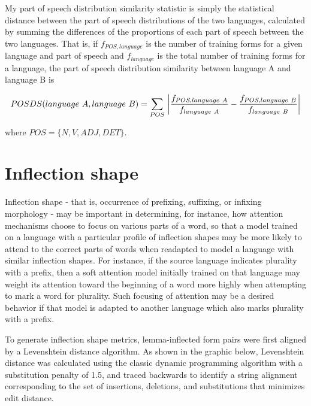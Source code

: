 My part of speech distribution similarity statistic is simply the statistical distance between the part of speech distributions of the two languages, calculated by summing the differences of the proportions of each part of speech between the two languages. That is, if $f_{POS, language}$ is the number of training forms for a given language and part of speech and $f_{language}$ is the total number of training forms for a language, the part of speech distribution similarity between language A and language B is

\[POSDS(language\ A, language\ B) = \sum\limits_{POS}\ \abs*{\frac{f_{POS, language\ A}}{f_{language\ A}} - \frac{f_{POS, language\ B}}{f_{language\ B}}}\]

where $POS = \{N, V, ADJ, DET\}$.

\section{Inflection shape}

Inflection shape - that is, occurrence of prefixing, suffixing, or infixing morphology - may be important in determining, for instance, how attention mechanisms choose to focus on various parts of a word, so that a model trained on a language with a particular profile of inflection shapes may be more likely to attend to the correct parts of words when readapted to model a language with similar inflection shapes. For instance, if the source language indicates plurality with a prefix, then a soft attention model initially trained on that language may weight its attention toward the beginning of a word more highly when attempting to mark a word for plurality. Such focusing of attention may be a desired behavior if that model is adapted to another language which also marks plurality with a prefix.

To generate inflection shape metrics, lemma-inflected form pairs were first aligned by a Levenshtein distance algorithm. As shown in the graphic below, Levenshtein distance was calculated using the classic dynamic programming algorithm with a substitution penalty of 1.5, and traced backwards to identify a string alignment corresponding to the set of insertions, deletions, and substitutions that minimizes edit distance.

